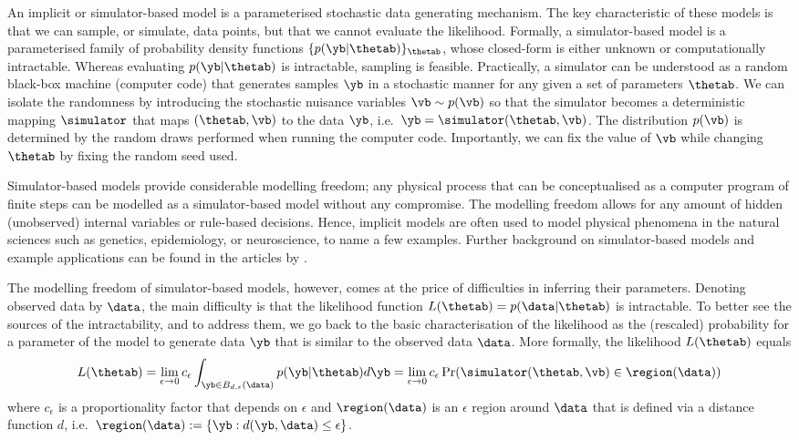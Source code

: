 An implicit or simulator-based model is a parameterised stochastic
data generating mechanism. The key characteristic of these models is
that we can sample, or simulate, data points, but that we cannot
evaluate the likelihood. Formally, a simulator-based model is a
parameterised family of probability density functions $\{
p(\yb|\thetab) \}_{\thetab}$, whose closed-form is either unknown or
computationally intractable. Whereas evaluating $p(\yb|\thetab)$ is
intractable, sampling is feasible. Practically, a simulator can be
understood as a random black-box machine (computer code) that
generates samples $\yb$ in a stochastic manner for any given a set of
parameters $\thetab$. We can isolate the randomness by introducing the
stochastic nuisance variables $\vb \sim p(\vb)$ so that the simulator
becomes a deterministic mapping $\simulator$ that maps
$(\thetab, \vb)$ to the data $\yb$, i.e.\
$\yb=\simulator(\thetab,\vb)$. The distribution $p(\vb)$ is determined
by the random draws performed when running the computer
code. Importantly, we can fix the value of $\vb$ while changing
$\thetab$ by fixing the random seed used.

Simulator-based models provide considerable modelling freedom; any
physical process that can be conceptualised as a computer program of
finite steps can be modelled as a simulator-based model without any
compromise. The modelling freedom allows for any amount of hidden
(unobserved) internal variables or rule-based decisions. Hence,
implicit models are often used to model physical phenomena in the
natural sciences such as genetics, epidemiology, or neuroscience, to
name a few examples. Further background on simulator-based models and
example applications can be found in the articles
by \citet{Gutmann2016, Lintusaari2017, Sisson2018, Cranmer2020}.


The modelling freedom of simulator-based models, however, comes at the
price of difficulties in inferring their parameters. Denoting observed
data by $\data$, the main difficulty is that the likelihood function
$L(\thetab) = p(\data|\thetab)$ is intractable. To better see the
sources of the intractability, and to address them, we go back to the
basic characterisation of the likelihood as the (rescaled) probability
for a parameter of the model to generate data $\yb$ that is similar to
the observed data $\data$. More formally, the likelihood $L(\thetab)$
equals
\begin{equation} \label{eq:likelihood}
  L(\thetab) = \lim_{\epsilon \to 0} c_\epsilon \int_{\yb \in B_{d,\epsilon}(\data)} p(\yb|\thetab)d\yb =
  \lim_{\epsilon \to 0} c_\epsilon \Pr(\simulator(\thetab, \vb) \in \region(\data))
\end{equation}
where $c_\epsilon$ is a proportionality factor that depends on
$\epsilon$ and $\region(\data)$ is an $\epsilon$ region around $\data$
that is defined via a distance function $d$, i.e.\ $\region(\data)
:= \{\yb: d(\yb, \data) \leq \epsilon \}$. 


